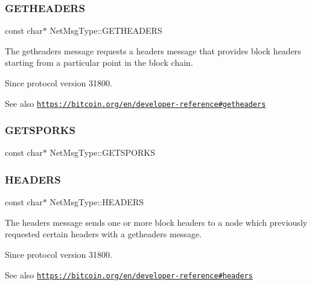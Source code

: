 \subsubsection{\texorpdfstring{G\+E\+T\+H\+E\+A\+D\+E\+RS}{GETHEADERS}}
{\footnotesize\ttfamily const char$\ast$ Net\+Msg\+Type\+::\+G\+E\+T\+H\+E\+A\+D\+E\+RS}

The getheaders message requests a headers message that provides block headers starting from a particular point in the block chain. \begin{DoxySince}{Since}
protocol version 31800. 
\end{DoxySince}
\begin{DoxySeeAlso}{See also}
\href{https://bitcoin.org/en/developer-reference#getheaders}{\tt https\+://bitcoin.\+org/en/developer-\/reference\#getheaders} 
\end{DoxySeeAlso}
\mbox{\label{namespace_net_msg_type_a541f0df7bbda1b9beb91a07e1bcfba04}} 
\subsubsection{\texorpdfstring{G\+E\+T\+S\+P\+O\+R\+KS}{GETSPORKS}}
{\footnotesize\ttfamily const char$\ast$ Net\+Msg\+Type\+::\+G\+E\+T\+S\+P\+O\+R\+KS}

\mbox{\label{namespace_net_msg_type_a6bac0bfca86c6778b3fba4a3ade720fe}} 
\subsubsection{\texorpdfstring{H\+E\+A\+D\+E\+RS}{HEADERS}}
{\footnotesize\ttfamily const char$\ast$ Net\+Msg\+Type\+::\+H\+E\+A\+D\+E\+RS}

The headers message sends one or more block headers to a node which previously requested certain headers with a getheaders message. \begin{DoxySince}{Since}
protocol version 31800. 
\end{DoxySince}
\begin{DoxySeeAlso}{See also}
\href{https://bitcoin.org/en/developer-reference#headers}{\tt https\+://bitcoin.\+org/en/developer-\/reference\#headers} 
\end{DoxySeeAlso}
\mbox{\label{namespace_net_msg_type_abc3232f64bb9898aae1b3d25f805f9a9}} 
